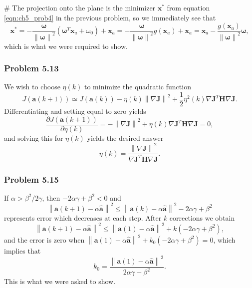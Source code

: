 \documentclass[12pt, a4paper]{article}
\newcommand{\vect}[1]{\bm{#1}}
\newcommand{\norm}[1]{\left\lVert#1\right\rVert}
\begin{document}
\begin{easylist}[enumerate]
	# The projection onto the plane is the minimizer $\vect{x}^*$ from equation \eqref{eqn:ch5_prob4} in the previous problem, so we immediately see that 
	\begin{equation*}
	\vect{x}^* = -\frac{\vect{\omega}}{\norm{\vect{\omega}}^2} \left( \vect{\omega}^T \vect{x}_a + \omega_0 \right) + \vect{x}_a = - \frac{\vect{\omega}}{\norm{\vect{\omega}}^2} g(\vect{x}_a) + \vect{x}_a
	=  
	\vect{x}_a - \frac{g(\vect{x}_a)}{\norm{\vect{\omega}}^2}  \vect{\omega},
	\end{equation*}
	which is what we were required to show.
\end{easylist}

\subsubsection*{Problem 5.13}
We wish to choose $\eta(k)$ to minimize the quadratic function
\begin{equation*}
	J \left( \vect{a}(k+1)  \right)
	\simeq
	J \left( \vect{a}(k)  \right)
	-
	\eta(k) \norm{\nabla \vect{J}}^2
	+
	\frac{1}{2} \eta^2(k) \nabla \vect{J}^T \vect{H} \nabla \vect{J}.
\end{equation*}
Differentiating and setting equal to zero yields
\begin{equation*}
	\frac{\partial J \left( \vect{a}(k+1)  \right)}{\partial \eta(k)}
	=
	-
	\norm{\nabla \vect{J}}^2
	+
	\eta(k) \nabla \vect{J}^T \vect{H} \nabla \vect{J} = 0,
\end{equation*}
and solving this for $\eta(k)$ yields the desired answer
\begin{equation*}
	\eta(k) = \frac{\norm{\nabla \vect{J}}^2}{\nabla \vect{J}^T \vect{H} \nabla \vect{J}}.
\end{equation*}

\subsubsection*{Problem 5.15}
If $\alpha > \beta^2 / 2 \gamma$, then $-2 \alpha \gamma +\beta^2 < 0$ and 
\begin{equation*}
	\norm{\vect{a}(k+1) - \alpha \hat{\vect{a}}}^2 
	\leq
	\norm{\vect{a}(k) - \alpha \hat{\vect{a}}}^2 - 2 \alpha \gamma +\beta^2
\end{equation*}
represents error which decreases at each step.
After $k$ corrections we obtain
\begin{equation*}
\norm{\vect{a}(k+1) - \alpha \hat{\vect{a}}}^2 
\leq
\norm{\vect{a}(1) - \alpha \hat{\vect{a}}}^2 + k(-2 \alpha \gamma +\beta^2),
\end{equation*}
and the error is zero when $\norm{\vect{a}(1) - \alpha \hat{\vect{a}}}^2 + k_0(-2 \alpha \gamma +\beta^2) = 0$, which implies that
\begin{equation*}
	k_0 = \frac{\norm{\vect{a}(1) - \alpha \hat{\vect{a}}}^2}{2 \alpha \gamma - \beta^2}.
\end{equation*}
This is what we were asked to show.
\end{document}
